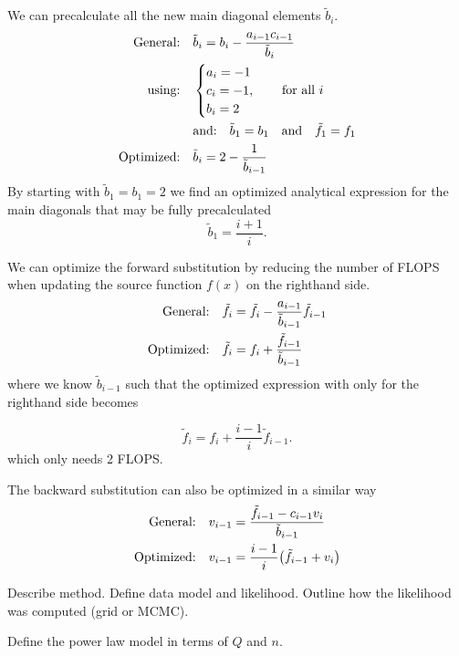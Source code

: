 \documentclass{emulateapj}
\begin{document}
We can precalculate all the new main diagonal elements $\tilde{b}_i$.
\begin{align*}
\qq*{General:}& \tilde{b}_i = b_i - \frac{a_{i-1}c_{i-1}}{\tilde{b}_i}
\\
\qq*{using:}& 
\begin{cases} a_i = -1 \\ c_i = -1 \qc \\ b_i = 2 \end{cases} \text{for all } i
\\
&\qq*{and:}
\tilde{b}_1 = b_1 \qand \tilde{f}_1 = f_1
\\
\qq*{Optimized:}& \tilde{b}_i = 2 - \frac{1}{\tilde{b}_{i-1}} 
\end{align*}
By starting with $\tilde{b}_1 = b_1 = 2$ we find an optimized analytical expression for the main diagonals that may be fully precalculated
\begin{equation}
\tilde{b}_1 = \frac{i+1}{i} .\label{Eq: Optimized main diagonals}
\end{equation}

We can optimize the forward substitution by reducing the number of FLOPS when updating the source function $f(x)$ on the righthand side.
\begin{align*}
\qq*{General:}& \tilde{f}_i = \tilde{f}_i - \frac{a_{i-1}}{\tilde{b}_{i-1}}\tilde{f}_{i-1}
\\
\qq*{Optimized:}& \tilde{f}_i = f_i + \frac{\tilde{f}_{i-1}}{\tilde{b}_{i-1}}
\end{align*}
where we know $\tilde{b}_{i-1}$ such that the optimized expression with only for the righthand side becomes

\begin{equation}
\tilde{f}_i = f_i + \frac{i-1}{i}\tilde{f}_{i-1} .\label{Eq: Optimized source function}
\end{equation}
which only needs 2 FLOPS.

The backward substitution can also be optimized in a similar way
\begin{align*}
\qq*{General:}& v_{i-1} = \frac{\tilde{f}_{i-1} - c_{i-1}v_i}{\tilde{b}_{i-1}}
\\
\qq*{Optimized:}& v_{i-1} = \frac{i-1}{i}\qty(\tilde{f}_{i-1}+v_i)
\end{align*}

Describe method. Define data model and likelihood. Outline how the
likelihood was computed (grid or MCMC).

Define the power law model in terms of $Q$ and $n$. 
\end{document}
